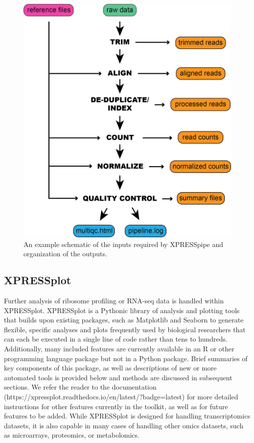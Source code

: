 \documentclass[11pt, a4paper, oneside]{article}
\begin{document}
\begin{figure}
\centering
  \includegraphics[width=120mm]{figures/xpresspipe_overview.png}
  \caption{An example schematic of the inputs required by XPRESSpipe and organization of the outputs.}
  \label{fig:outputs}
\end{figure}


\subsection{XPRESSplot}
Further analysis of ribosome profiling or RNA-seq data is handled within XPRESSplot. XPRESSplot is a Pythonic library of analysis and plotting tools that builds upon existing packages, such as Matplotlib \cite{matplotlib} and Seaborn \cite{seaborn} to generate flexible, specific analyses and plots frequently used by biological researchers that can each be executed in a single line of code rather than tens to hundreds. Additionally, many included features are currently available in an R or other programming language package but not in a Python package. Brief summaries of key components of this package, as well as descriptions of new or more automated tools is provided below and methods are discussed in subsequent sections. We refer the reader to the documentation (https://xpressplot.readthedocs.io/en/latest/?badge=latest) for more detailed instructions for other features currently in the toolkit, as well as for future features to be added. While XPRESSplot is designed for handling transcriptomics datasets, it is also capable in many cases of handling other omics datasets, such as microarrays, proteomics, or metabolomics.
\end{document}
